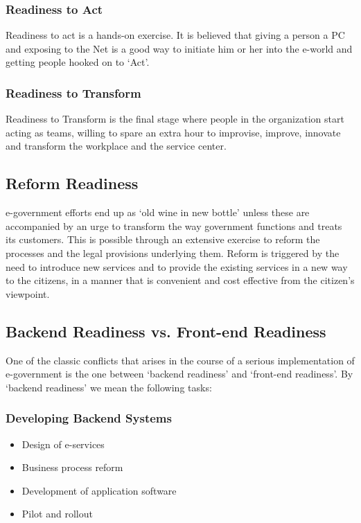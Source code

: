 \subsubsection{Readiness to Act}
Readiness to act is a hands-on exercise. It is believed that giving a person a PC and exposing to the Net is a good way to initiate him or her into the e-world and getting people hooked on to `Act'.

\subsubsection{Readiness to Transform}
Readiness to Transform is the final stage where people in the organization start acting as teams, willing to spare an extra hour to improvise, improve, innovate and transform the workplace and the service center.

\subsection{Reform Readiness}
e-government efforts end up as `old wine in new bottle' unless these are accompanied by an urge to transform the way government functions and treats its customers. This is possible through an extensive exercise to reform the processes and the legal provisions underlying them. Reform is triggered by the need to introduce new services and to provide the existing services in a new way to the citizens, in a manner that is convenient and cost effective from the citizen's viewpoint.


\subsection{Backend Readiness vs. Front-end Readiness}
One of the classic conflicts that arises in the course of a serious implementation of e-government is the one between `backend readiness' and `front-end readiness'. By `backend readiness' we mean the following tasks:

\subsubsection*{Developing Backend Systems}
\begin{itemize}
	\item Design of e-services
	\item Business process reform
	\item Development of application software
	\item Pilot and rollout
\end{itemize}


